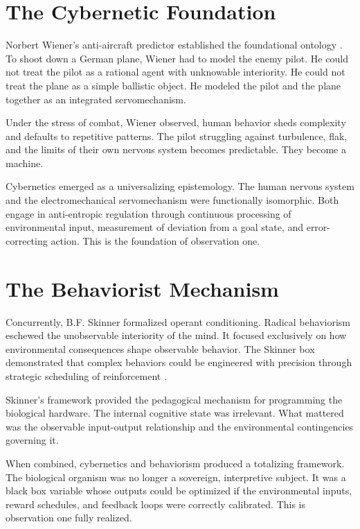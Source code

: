 \documentclass[runningheads]{llncs}
\begin{document}
\section{The Cybernetic Foundation}

Norbert Wiener's anti-aircraft predictor established the foundational ontology \cite{wiener1948cybernetics}. To shoot down a German plane, Wiener had to model the enemy pilot. He could not treat the pilot as a rational agent with unknowable interiority. He could not treat the plane as a simple ballistic object. He modeled the pilot and the plane together as an integrated servomechanism.

Under the stress of combat, Wiener observed, human behavior sheds complexity and defaults to repetitive patterns. The pilot struggling against turbulence, flak, and the limits of their own nervous system becomes predictable. They become a machine.

Cybernetics emerged as a universalizing epistemology. The human nervous system and the electromechanical servomechanism were functionally isomorphic. Both engage in anti-entropic regulation through continuous processing of environmental input, measurement of deviation from a goal state, and error-correcting action. This is the foundation of observation one.

\section{The Behaviorist Mechanism}

Concurrently, B.F. Skinner formalized operant conditioning. Radical behaviorism eschewed the unobservable interiority of the mind. It focused exclusively on how environmental consequences shape observable behavior. The Skinner box demonstrated that complex behaviors could be engineered with precision through strategic scheduling of reinforcement \cite{skinner1953science}.

Skinner's framework provided the pedagogical mechanism for programming the biological hardware. The internal cognitive state was irrelevant. What mattered was the observable input-output relationship and the environmental contingencies governing it.

When combined, cybernetics and behaviorism produced a totalizing framework. The biological organism was no longer a sovereign, interpretive subject. It was a black box variable whose outputs could be optimized if the environmental inputs, reward schedules, and feedback loops were correctly calibrated. This is observation one fully realized.
\end{document}

